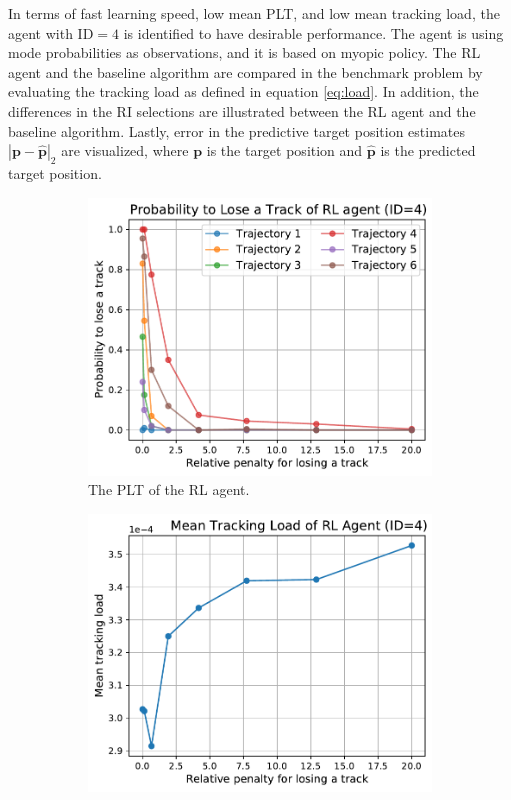 \documentclass[english, 12pt, a4paper, elec, utf8, a-1b, online]{aaltothesis}
\renewcommand{\vec}[1]{\mathbf{#1}}
\begin{document}
In terms of fast learning speed, low mean PLT, and low mean tracking load, the agent with $\text{ID}=4$ is identified to have desirable performance.
The agent is using mode probabilities as observations, and it is based on myopic policy.
The RL agent and the baseline algorithm are compared in the benchmark problem by evaluating the tracking load as defined in equation \eqref{eq:load}.
In addition, the differences in the RI selections are illustrated between the RL agent and the baseline algorithm.
Lastly, error in the predictive target position estimates $|\vec{p}-\hat{\vec{p}}|_2$ are visualized, where $\vec{p}$ is the target position and $\hat{\vec{p}}$ is the predicted target position.

\begin{figure}
    \centering
    \begin{subfigure}[b]{0.45\textwidth}
        \includegraphics[width=\linewidth]{figures/benchmark/Simulations/plt_agent.pdf}
        \caption{The PLT of the RL agent.}
        \label{fig:penalty_plt}
    \end{subfigure}
    \hfill
    \begin{subfigure}[b]{0.45\textwidth}
        \includegraphics[width=\linewidth]{figures/benchmark/Simulations/tracking_load_agent.pdf}

\end{subfigure}
\end{figure}
\end{document}
